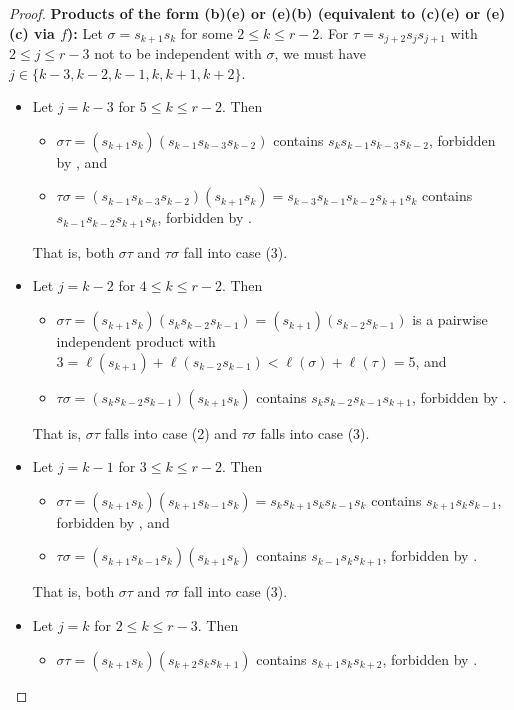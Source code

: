 \documentclass[10pt,a4paper]{amsart}
\begin{document}
\begin{proof}
\smallskip
\noindent \textbf{Products of the form (b)(e) or (e)(b) (equivalent to (c)(e) or (e)(c) via $f$):}
    Let $\sigma=s_{k+1}s_k$ for some $2\leq k\leq r-2$. For $\tau=s_{j+2}s_js_{j+1}$ with $2\leq j\leq r-3$ not to be independent with $\sigma$, we must have $j\in\{k-3,k-2,k-1,k,k+1,k+2\}$.
        \begin{itemize}
        \item Let $j=k-3$ for $5\leq k\leq r-2$. Then \begin{itemize}
            \item $\sigma\tau=(s_{k+1}s_k)(s_{k-1}s_{k-3}s_{k-2})$ contains $s_ks_{k-1}s_{k-3}s_{k-2}$, forbidden by , and
            \item $\tau\sigma= (s_{k-1}s_{k-3}s_{k-2})(s_{k+1}s_k)= s_{k-3}s_{k-1}s_{k-2}s_{k+1}s_k$ contains $s_{k-1}s_{k-2}s_{k+1}s_k$, forbidden by .
        \end{itemize}
        That is, both $\sigma\tau$ and $\tau\sigma$ fall into case (3).
        \item Let $j=k-2$ for $4\leq k\leq r-2$. Then \begin{itemize}
            \item $\sigma\tau=(s_{k+1}s_k)(s_{k}s_{k-2}s_{k-1})= (s_{k+1})(s_{k-2}s_{k-1})$ is a pairwise independent product with $3=\ell(s_{k+1})+\ell(s_{k-2}s_{k-1})<\ell(\sigma)+\ell(\tau)=5$, and
            \item $\tau\sigma= (s_{k}s_{k-2}s_{k-1})(s_{k+1}s_k)$ contains $s_{k}s_{k-2}s_{k-1}s_{k+1}$, forbidden by .
        \end{itemize}
        That is, $\sigma\tau$ falls into case (2) and $\tau\sigma$ falls into case (3).
        \item Let $j=k-1$ for $3\leq k\leq r-2$. Then \begin{itemize}
            \item $\sigma\tau=(s_{k+1}s_k)(s_{k+1}s_{k-1}s_{k}) = s_ks_{k+1}s_ks_{k-1}s_k$ contains $s_{k+1}s_ks_{k-1}$, forbidden by , and
            \item $\tau\sigma= (s_{k+1}s_{k-1}s_{k})(s_{k+1}s_k)$ contains $s_{k-1}s_{k}s_{k+1}$, forbidden by .
        \end{itemize}
        That is, both $\sigma\tau$ and $\tau\sigma$ fall into case (3).
        \item Let $j=k$ for $2\leq k\leq r-3$. Then \begin{itemize}
            \item $\sigma\tau=(s_{k+1}s_k)(s_{k+2}s_{k}s_{k+1})$ contains $s_{k+1}s_ks_{k+2}$, forbidden by .

\end{itemize}
\end{itemize}
\end{proof}
\end{document}
